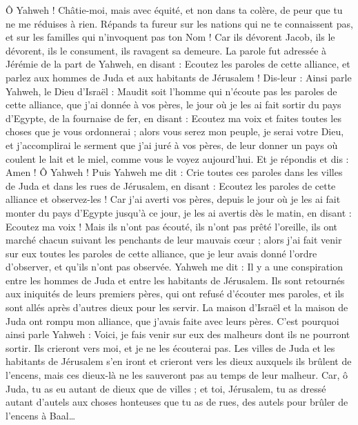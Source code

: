 \begin{multicols}{2}
Ô Yahweh ! Châtie-moi, mais avec équité, et non dans ta colère, de peur que tu ne me réduises à rien.
Répands ta fureur sur les nations qui ne te connaissent pas, et sur les familles qui n'invoquent pas ton Nom ! Car ils dévorent Jacob, ils le dévorent, ils le consument, ils ravagent sa demeure.
\VerseOne{}La parole fut adressée à Jérémie de la part de Yahweh, en disant :
Ecoutez les paroles de cette alliance, et parlez aux hommes de Juda et aux habitants de Jérusalem !
Dis-leur : Ainsi parle Yahweh, le Dieu d'Israël : Maudit soit l'homme qui n'écoute pas les paroles de cette alliance,
que j'ai donnée à vos pères, le jour où je les ai fait sortir du pays d'Egypte, de la fournaise de fer, en disant : Ecoutez ma voix et faites toutes les choses que je vous ordonnerai ; alors vous serez mon peuple, je serai votre Dieu,
et j'accomplirai le serment que j'ai juré à vos pères, de leur donner un pays où coulent le lait et le miel, comme vous le voyez aujourd'hui. Et je répondis et dis : Amen ! Ô Yahweh !
Puis Yahweh me dit : Crie toutes ces paroles dans les villes de Juda et dans les rues de Jérusalem, en disant : Ecoutez les paroles de cette alliance et observez-les !
Car j'ai averti vos pères, depuis le jour où je les ai fait monter du pays d'Egypte jusqu'à ce jour, je les ai avertis dès le matin, en disant : Ecoutez ma voix !
Mais ils n'ont pas écouté, ils n'ont pas prêté l'oreille, ils ont marché chacun suivant les penchants de leur mauvais cœur ; alors j'ai fait venir sur eux toutes les paroles de cette alliance, que je leur avais donné l'ordre d'observer, et qu'ils n'ont pas observée.
Yahweh me dit : Il y a une conspiration entre les hommes de Juda et entre les habitants de Jérusalem.
Ils sont retournés aux iniquités de leurs premiers pères, qui ont refusé d'écouter mes paroles, et ils sont allés après d'autres dieux pour les servir. La maison d'Israël et la maison de Juda ont rompu mon alliance, que j'avais faite avec leurs pères.
C'est pourquoi ainsi parle Yahweh : Voici, je fais venir sur eux des malheurs dont ils ne pourront sortir. Ils crieront vers moi, et je ne les écouterai pas.
Les villes de Juda et les habitants de Jérusalem s'en iront et crieront vers les dieux auxquels ils brûlent de l'encens, mais ces dieux-là ne les sauveront pas au temps de leur malheur.
Car, ô Juda, tu as eu autant de dieux que de villes ; et toi, Jérusalem, tu as dressé autant d'autels aux choses honteuses que tu as de rues, des autels pour brûler de l'encens à Baal…

\end{multicols}
